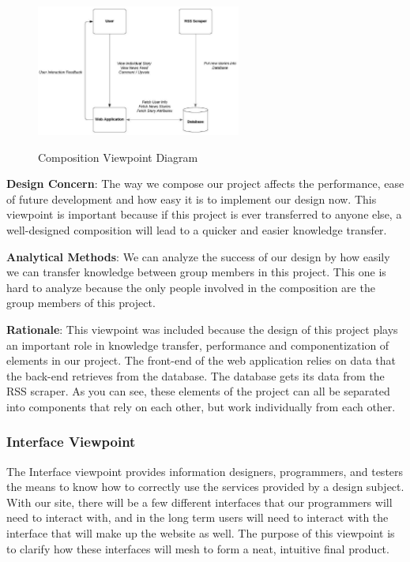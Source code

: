 \documentclass[onecolumn, draftclsnofoot,10pt, compsoc]{IEEEtran}
\begin{document}
\begin{figure}[!ht]
    \centering
    \caption{Composition Viewpoint Diagram}
    \includegraphics[width=0.6\textwidth]{composition_vp.eps}
    \label{composition_vp}
\end{figure}

\hangindent=0.5cm \textbf{Design Concern}: The way we compose our project affects the performance, ease of future development and how easy it is to implement our design now. This viewpoint is important because if this project is ever transferred to anyone else, a well-designed composition will lead to a quicker and easier knowledge transfer.

\hangindent=0.5cm \textbf{Analytical Methods}: We can analyze the success of our design by how easily we can transfer knowledge between group members in this project. This one is hard to analyze because the only people involved in the composition are the group members of this project.

\hangindent=0.5cm \textbf{Rationale}: This viewpoint was included because the design of this project plays an important role in knowledge transfer, performance and componentization of elements in our project. The front-end of the web application relies on data that the back-end retrieves from the database. The database gets its data from the RSS scraper. As you can see, these elements of the project can all be separated into components that rely on each other, but work individually from each other.

\subsubsection{Interface Viewpoint}
The Interface viewpoint provides information designers, programmers, and testers the means to know how
to correctly use the services provided by a design subject. With our site, there will be a few different interfaces that our programmers will need to interact with, and in the long term users will need to interact with the interface that will make up the website as well. The purpose of this viewpoint is to clarify how these interfaces will mesh to form a neat, intuitive final product.
\end{document}
